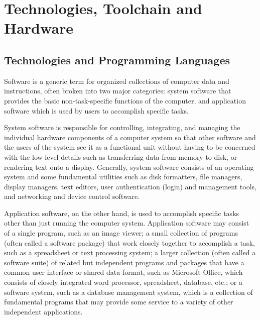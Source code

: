 
\chapter{Technologies, Toolchain and Hardware} %

\label{Technologies, Toolchain and Hardware} %


\section{Technologies and Programming Languages}
Software is a generic term for organized collections of computer data and instructions, often broken into two major categories: system software that provides the basic non-task-specific functions of the computer, and application software which is used by users to accomplish specific tasks.
\newline

System software is responsible for controlling, integrating, and managing the individual hardware components of a computer system so that other software and the users of the system see it as a functional unit without having to be concerned with the low-level details such as transferring data from memory to disk, or rendering text onto a display. Generally, system software consists of an operating system and some fundamental utilities such as disk formatters, file managers, display managers, text editors, user authentication (login) and management tools, and networking and device control software. 
\newline

Application software, on the other hand, is used to accomplish specific tasks other than just running the computer system. Application software may consist of a single program, such as an image viewer; a small collection of programs (often called a software package) that work closely together to accomplish a task, such as a spreadsheet or text processing system; a larger collection (often called a software suite) of related but independent programs and packages that have a common user interface or shared data format, such as Microsoft Office, which consists of closely integrated word processor, spreadsheet, database, etc.; or a software system, such as a database management system, which is a collection of fundamental programs that may provide some service to a variety of other independent applications. 
\newline

